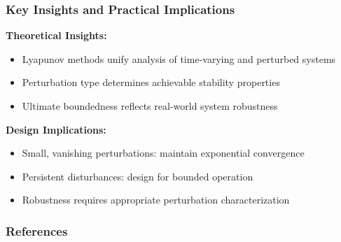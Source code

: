 \documentclass[student, noshadow, lsr, english, aspectratio=169, t]{ITR_LSR_slides}
\begin{document}
\begin{frame}
    \frametitle{Key Insights and Practical Implications}
    
    \textbf{Theoretical Insights:}
    \begin{itemize}
        \setlength{\itemsep}{8pt}
        \item Lyapunov methods unify analysis of time-varying and perturbed systems
        \item Perturbation type determines achievable stability properties
        \item Ultimate boundedness reflects real-world system robustness
    \end{itemize}
    
    \vspace{0.8cm}
    \textbf{Design Implications:}
    \begin{itemize}
        \setlength{\itemsep}{8pt}
        \item Small, vanishing perturbations: maintain exponential convergence
        \item Persistent disturbances: design for bounded operation
        \item Robustness requires appropriate perturbation characterization
    \end{itemize}
\end{frame}




\appendix

\begin{frame}[allowframebreaks]
    \frametitle{References}
    \nocite{*} 
    \printbibliography[heading=none]
\end{frame}
\end{document}
